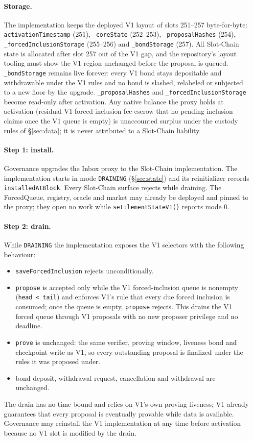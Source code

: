 \documentclass[a4paper,11pt]{article}
\newcommand{\code}[1]{\nolinkurl{#1}}
\begin{document}
\paragraph{Storage.}  The implementation keeps the deployed V1 layout of
slots 251--257 byte-for-byte: \code{activationTimestamp} (251),
\code{_coreState} (252--253), \code{_proposalHashes} (254),
\code{_forcedInclusionStorage} (255--256) and \code{_bondStorage} (257).  All
Slot-Chain state is allocated after slot 257 out of the V1 gap, and the
repository's layout tooling must show the V1 region unchanged before the
proposal is queued.  \code{_bondStorage} remains live forever: every V1 bond
stays depositable and withdrawable under the V1 rules and no bond is slashed,
relabeled or subjected to a new floor by the upgrade.  \code{_proposalHashes}
and \code{_forcedInclusionStorage} become read-only after activation.  Any
native balance the proxy holds at activation (residual V1 forced-inclusion
fee escrow that no pending inclusion claims once the V1 queue is empty) is
unaccounted surplus under the custody rules of \S\ref{sec:data}; it is never
attributed to a Slot-Chain liability.

\paragraph{Step 1: install.}  Governance upgrades the Inbox proxy to the
Slot-Chain implementation.  The implementation starts in mode \code{DRAINING}
(\S\ref{sec:state}) and its reinitializer records \code{installedAtBlock}.
Every Slot-Chain surface rejects while draining.  The ForcedQueue, registry,
oracle and market may already be deployed and pinned to the proxy; they open
no work while \code{settlementStateV1()} reports mode 0.

\paragraph{Step 2: drain.}  While \code{DRAINING} the implementation exposes
the V1 selectors with the following behaviour:
\begin{itemize}
\item \code{saveForcedInclusion} rejects unconditionally.
\item \code{propose} is accepted only while the V1 forced-inclusion queue is
  nonempty (\code{head < tail}) and enforces V1's rule that every due forced
  inclusion is consumed; once the queue is empty, \code{propose} rejects.
  This drains the V1 forced queue through V1 proposals with no new proposer
  privilege and no deadline.
\item \code{prove} is unchanged: the same verifier, proving window, liveness
  bond and checkpoint write as V1, so every outstanding proposal is finalized
  under the rules it was proposed under.
\item bond deposit, withdrawal request, cancellation and withdrawal are
  unchanged.
\end{itemize}
The drain has no time bound and relies on V1's own proving liveness; V1
already guarantees that every proposal is eventually provable while data is
available.  Governance may reinstall the V1 implementation at any time before
activation because no V1 slot is modified by the drain.
\end{document}
